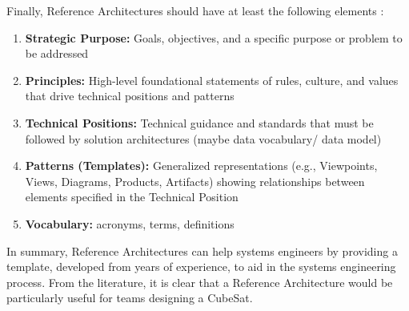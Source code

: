 Finally, Reference Architectures should have at least the following elements \citep{Cloutier2010}:
\begin{enumerate}
\item{\textbf{Strategic Purpose:} Goals, objectives, and a specific purpose or problem to be addressed}
\item{\textbf{Principles:} High-level foundational statements of rules, culture, and values that drive  technical positions and patterns}
\item{\textbf{Technical Positions:} Technical guidance and standards that must be followed by solution  architectures (maybe data vocabulary/ data model)}
\item{\textbf{Patterns (Templates):} Generalized representations (e.g., Viewpoints, Views, Diagrams, Products, Artifacts) showing relationships between elements specified in the Technical Position}
\item{\textbf{Vocabulary:} acronyms, terms, definitions}
\end{enumerate}

In summary, Reference Architectures can help systems engineers by providing a template, developed from years of experience, to aid in the systems engineering process. From the literature, it is clear that a Reference Architecture would be particularly useful for teams designing a CubeSat.

